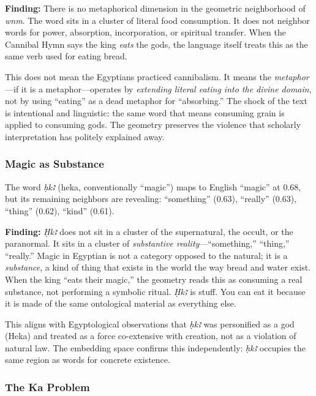 \documentclass[11pt, a4paper]{article}
\begin{document}
{\color{insight}\textbf{Finding:}} There is no metaphorical dimension in the geometric neighborhood of \textit{wnm}. The word sits in a cluster of literal food consumption. It does not neighbor words for power, absorption, incorporation, or spiritual transfer. When the Cannibal Hymn says the king \textit{eats} the gods, the language itself treats this as the same verb used for eating bread.

This does not mean the Egyptians practiced cannibalism. It means the \textit{metaphor}---if it is a metaphor---operates by \textit{extending literal eating into the divine domain}, not by using ``eating'' as a dead metaphor for ``absorbing.'' The shock of the text is intentional and linguistic: the same word that means consuming grain is applied to consuming gods. The geometry preserves the violence that scholarly interpretation has politely explained away.

\subsubsection{Magic as Substance}

The word \textit{ḥkꜣ} (heka, conventionally ``magic'') maps to English ``magic'' at 0.68, but its remaining neighbors are revealing: ``something'' (0.63), ``really'' (0.63), ``thing'' (0.62), ``kind'' (0.61).

{\color{insight}\textbf{Finding:}} \textit{Ḥkꜣ} does not sit in a cluster of the supernatural, the occult, or the paranormal. It sits in a cluster of \textit{substantive reality}---``something,'' ``thing,'' ``really.'' Magic in Egyptian is not a category opposed to the natural; it is a \textit{substance}, a kind of thing that exists in the world the way bread and water exist. When the king ``eats their magic,'' the geometry reads this as consuming a real substance, not performing a symbolic ritual. \textit{Ḥkꜣ} is stuff. You can eat it because it is made of the same ontological material as everything else.

This aligns with Egyptological observations that \textit{ḥkꜣ} was personified as a god (Heka) and treated as a force co-extensive with creation, not as a violation of natural law. The embedding space confirms this independently: \textit{ḥkꜣ} occupies the same region as words for concrete existence.

\subsubsection{The Ka Problem}
\end{document}
